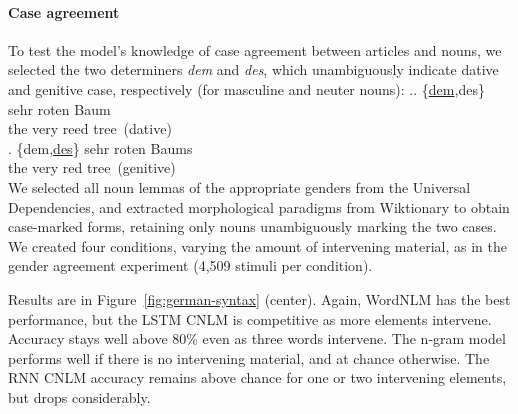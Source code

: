 \paragraph{Case agreement}
To test the model's knowledge of case agreement between articles and
nouns, we selected the two determiners \emph{dem} and \emph{des},
which unambiguously indicate dative and genitive case, respectively
(for masculine and neuter nouns): %
\ex.\ag. \{\underline{dem},des\} sehr roten Baum \\
the very reed tree\ (dative)\\
\bg. \{dem,\underline{des}\} sehr roten Baums \\
the very red tree\ (genitive) \\
%


We selected all noun lemmas of the
appropriate genders from the Universal Dependencies, and extracted
morphological paradigms from Wiktionary to obtain case-marked forms,
retaining only nouns unambiguously marking the two cases.  We created
four conditions, varying the amount of intervening material, as in the
gender agreement experiment (4,509 stimuli per condition).

Results are in Figure~\ref{fig:german-syntax} (center).  Again, WordNLM has
the best performance, but the LSTM CNLM is competitive as more
elements intervene. Accuracy stays well above 80\% even as three
words intervene.  The n-gram model performs well if there is no
intervening material, and at chance otherwise.  The RNN
CNLM accuracy remains above chance for one or two intervening elements, but
drops considerably.

